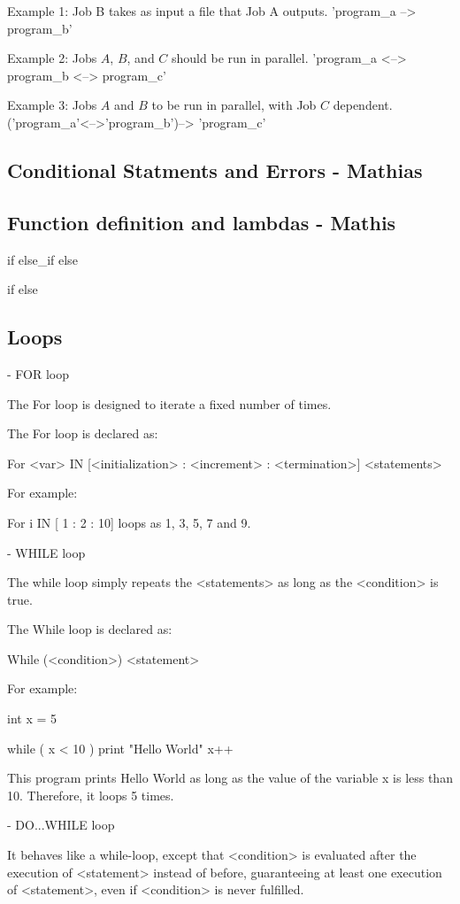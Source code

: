 Example 1:
Job B takes as input a file that Job A outputs. 'program_a --> program_b'

Example 2: 
Jobs $A$, $B$, and $C$ should be run in parallel. 'program_a <--> program_b <--> program_c'

Example 3:
Jobs $A$ and $B$ to be run in parallel, with Job $C$ dependent. ('program_a'<-->'program_b')--> 'program_c'
\subsection{Conditional Statments and Errors - Mathias}

\subsection{Function definition and lambdas - Mathis}

if {}
else\_if {}
else{}

if {}
else{}


\subsection{Loops}

- FOR loop

The For loop is designed to iterate a fixed number of times. 

The For loop is declared as:

For <var> IN [<initialization> : <increment> : <termination>]
{
     <statements>
}

For example:

For i IN [ 1 : 2 : 10] loops as 1, 3, 5, 7 and 9.


- WHILE loop

The while loop simply repeats the <statements> as long as the <condition> is true.

The While loop is declared as:

While (<condition>)
{
   <statement>
}

For example:

int x = 5

while ( x < 10 )
{
    print "Hello World"
    x++
}

This program prints Hello World as long as the value of the variable x is less than 10. Therefore, it loops 5 times.

- DO...WHILE loop

It behaves like a while-loop, except that <condition> is evaluated after the execution of <statement> instead of before, guaranteeing at least one execution of <statement>, even if <condition> is never fulfilled. 

